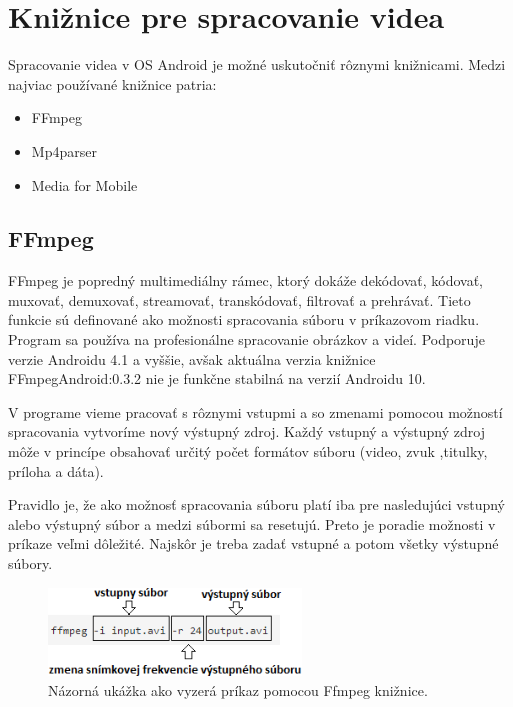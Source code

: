 \documentclass[12pt, oneside]{book}
\begin{document}
\section{Knižnice pre spracovanie videa}

\hspace{15pt} Spracovanie videa v OS Android je možné uskutočniť rôznymi knižnicami. Medzi najviac používané knižnice patria:
\begin{itemize}
\item FFmpeg
\item Mp4parser
\item Media for Mobile
\end{itemize}

\subsection{FFmpeg}

\hspace{15pt} FFmpeg je popredný multimediálny rámec, ktorý dokáže dekódovať, kódovať, muxovať, demuxovať, streamovať, transkódovať, filtrovať a prehrávať. Tieto funkcie sú definované ako možnosti spracovania súboru v príkazovom riadku. Program sa používa na profesionálne spracovanie obrázkov a videí. Podporuje verzie Androidu 4.1 a vyššie, avšak aktuálna verzia knižnice FFmpegAndroid:0.3.2 nie je funkčne stabilná na verzií Androidu 10. 

V programe vieme pracovať s rôznymi vstupmi a so zmenami pomocou možností spracovania vytvoríme nový výstupný zdroj. Každý vstupný a výstupný zdroj môže v princípe obsahovať určitý počet formátov súboru (video, zvuk ,titulky, príloha a dáta). 

Pravidlo je, že ako možnosť spracovania súboru platí iba pre nasledujúci vstupný alebo výstupný súbor a medzi súbormi sa resetujú. Preto je poradie možnosti v príkaze veľmi dôležité. Najskôr je treba zadať vstupné a potom všetky výstupné súbory.
 \cite{ffmpeg01}

\begin{figure}[h]
    \centering
    \includegraphics[width=0.6\textwidth]{images/obrazok1.png}
    \caption{Názorná ukážka ako vyzerá príkaz pomocou Ffmpeg knižnice.}
    \label{fig:obr01}
\end{figure}
\end{document}
